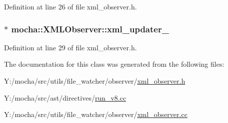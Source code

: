 Definition at line 26 of file xml\_\-observer.h.

\hypertarget{classmocha_1_1_x_m_l_observer_aa66735211c7a54e185f16933fcdf8b71}{
\subsubsection[{xml\_\-updater\_\-}]{$\ast$ {\bf mocha::XMLObserver::xml\_\-updater\_\-}}}
\label{classmocha_1_1_x_m_l_observer_aa66735211c7a54e185f16933fcdf8b71}


Definition at line 29 of file xml\_\-observer.h.



The documentation for this class was generated from the following files:\begin{DoxyCompactItemize}
\item 
Y:/mocha/src/utils/file\_\-watcher/observer/\hyperlink{xml__observer_8h}{xml\_\-observer.h}\item 
Y:/mocha/src/ast/directives/\hyperlink{run__v8_8cc}{run\_\-v8.cc}\item 
Y:/mocha/src/utils/file\_\-watcher/observer/\hyperlink{xml__observer_8cc}{xml\_\-observer.cc}\end{DoxyCompactItemize}
